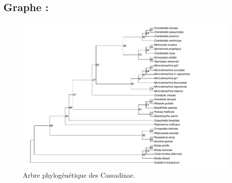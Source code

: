 \documentclass[a4paper, 12pt]{article}
\begin{document}
\subsection{Graphe :}

\begin{figure}[H]
    \centering
    \includegraphics[width=1.3\textwidth]{final_cassi.pdf}
    \caption{\small Arbre phylogénétique des Cassadinae.}
    \label{Cassi_tree}
\end{figure}
\end{document}
